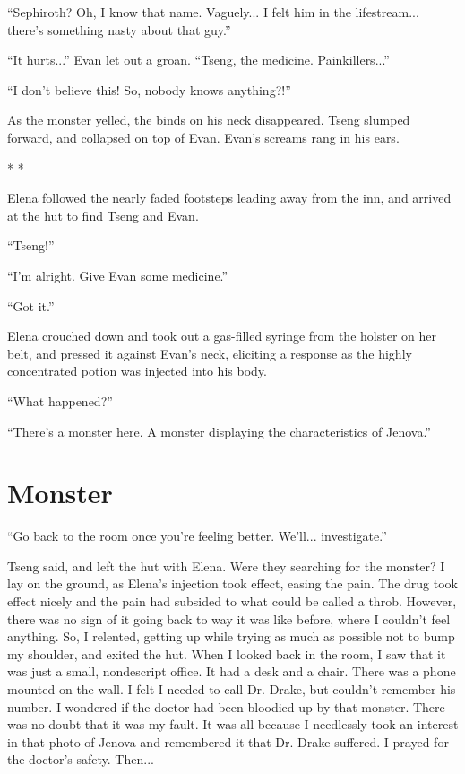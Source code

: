 \documentclass[oneside]{book}
\begin{document}
“Sephiroth? Oh, I know that name. Vaguely... I felt him in the lifestream... there’s something nasty about that guy.”

“It hurts...” Evan let out a groan. “Tseng, the medicine. Painkillers...”

“I don’t believe this! So, nobody knows anything?!”

As the monster yelled, the binds on his neck disappeared. Tseng slumped forward, and collapsed on top of Evan. Evan’s screams rang in his ears.

* *

Elena followed the nearly faded footsteps leading away from the inn, and arrived at the hut to find Tseng and Evan.

“Tseng!”

“I’m alright. Give Evan some medicine.”

“Got it.”

Elena crouched down and took out a gas-filled syringe from the holster on her belt, and pressed it against Evan’s neck, eliciting a response as the highly concentrated potion was injected into his body.

“What happened?”

“There’s a monster here. A monster displaying the characteristics of Jenova.”

\chapter{Monster}
“Go back to the room once you’re feeling better. We’ll... investigate.”

Tseng said, and left the hut with Elena. Were they searching for the monster? I lay on the ground, as Elena’s injection took effect, easing the pain. The drug took effect nicely and the pain had subsided to what could be called a throb. However, there was no sign of it going back to way it was like before, where I couldn’t feel anything. So, I relented, getting up while trying as much as possible not to bump my shoulder, and exited the hut. When I looked back in the room, I saw that it was just a small, nondescript office. It had a desk and a chair. There was a phone mounted on the wall. I felt I needed to call Dr. Drake, but couldn’t remember his number. I wondered if the doctor had been bloodied up by that monster. There was no doubt that it was my fault. It was all because I needlessly took an interest in that photo of Jenova and remembered it that Dr. Drake suffered. I prayed for the doctor’s safety. Then...
\end{document}
